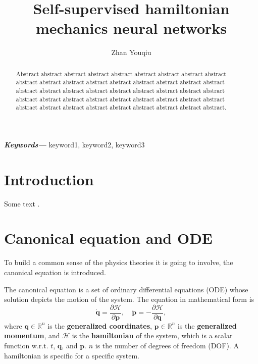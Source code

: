 \documentclass{article}
\title{Self-supervised hamiltonian mechanics neural networks}
\author{Zhan Youqiu}
\providecommand{\keywords}[1]
{
  \small	
  \textbf{\textit{Keywords---}} #1
}
\begin{document}
\maketitle

\begin{abstract}
Abstract abstract abstract abstract abstract abstract abstract abstract abstract abstract abstract abstract abstract abstract abstract abstract abstract abstract abstract abstract abstract abstract abstract abstract abstract abstract abstract abstract abstract abstract abstract abstract abstract abstract abstract abstract abstract abstract abstract abstract abstract abstract abstract abstract abstract.
\end{abstract}

\keywords{keyword1, keyword2, keyword3}

\tableofcontents

\section{Introduction}

Some text \cite{greydanus2019hamiltonian}.

\section{Canonical equation and ODE}

To build a common sense of the physics theories it is going to involve,
the canonical equation is introduced.

The canonical equation is a set of ordinary differential equations (ODE)
whose solution depicts the motion of the system.
The equation in mathematical form is \cite{hand2008mechanics}\cite[p. 65]{arnold1989mathmech}\cite[p. 132]{landau1976mechanics}
\begin{equation}
	\dot{\mathbf q}=\frac{\partial\mathcal H}{\partial\mathbf p},
	\quad
	\dot{\mathbf p}=-\frac{\partial\mathcal H}{\partial\mathbf q},
	\label{eq:canonical}
\end{equation}
where $\mathbf q\in\mathbb R^n$ is the \textbf{generalized coordinates},
$\mathbf p\in\mathbb R^n$ is the \textbf{generalized momentum},
and $\mathcal H$ is the \textbf{hamiltonian} of the system,
which is a scalar function w.r.t. $t$, $\mathbf q$, and $\mathbf p$.
$n$ is the number of degrees of freedom (DOF).
A hamiltonian is specific for a specific system.
\end{document}
